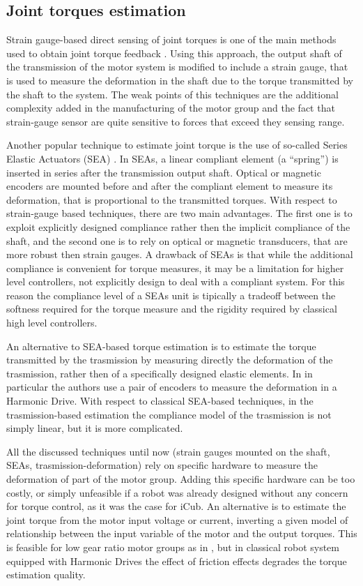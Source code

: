 \subsection{Joint torques estimation}
Strain gauge-based direct sensing of joint torques is one of the main methods used to obtain joint torque feedback \citep{Wu1980, Luh1983}. Using this approach, the output shaft of the transmission of the motor system is modified to include a strain gauge, that is used to measure the deformation in the shaft due to the torque transmitted by the shaft to the system. The weak points of this techniques are the additional complexity added in the manufacturing of the motor group \citep{Randazzo2011} and the fact that strain-gauge sensor are quite sensitive to forces that exceed they sensing range. 

Another popular technique to estimate joint torque is the use of so-called Series Elastic Actuators (SEA) \citep{Paine2015}. In SEAs, a
linear compliant element (a ``spring'') is inserted in series after the transmission output shaft. Optical or magnetic encoders are mounted before and after the compliant element to measure its deformation, that is proportional to the transmitted torques. With respect to strain-gauge based techniques, there are two main advantages. The first one is to exploit explicitly designed compliance rather then the implicit compliance of the shaft, and the second one is to rely on optical or magnetic transducers, that are more robust then strain gauges. A drawback of SEAs is that while the additional compliance is convenient for torque measures, it may be a limitation for higher level controllers, not explicitly design to deal with a compliant system. For this reason the compliance level of a SEAs unit is tipically a tradeoff between the softness required for the torque measure and the rigidity required by classical high level controllers. 

An alternative to SEA-based torque estimation is to estimate the torque transmitted by the trasmission by measuring directly the deformation of the trasmission, rather then of a specifically designed elastic elements. In \citep{Zhang2015} in particular the authors use a pair of encoders to measure the deformation in a Harmonic Drive. With respect to classical SEA-based techniques, in the trasmission-based estimation the compliance model of the trasmission is not simply linear, but it is more complicated. 

All the discussed techniques until now (strain gauges mounted on the shaft, SEAs, trasmission-deformation) rely on specific hardware to measure the deformation of part of the motor group. Adding this specific hardware can be too costly, or simply unfeasible if a robot was already designed without any concern for torque control, as it was the case for iCub. An alternative is to estimate the joint torque from the motor input voltage or current, inverting a given model of relationship between the input variable of the motor and the output torques. This is feasible for low gear ratio motor groups as in \citep{WensingChetah2017}, but in classical robot system equipped with Harmonic Drives the effect of friction effects degrades the torque estimation quality. 

